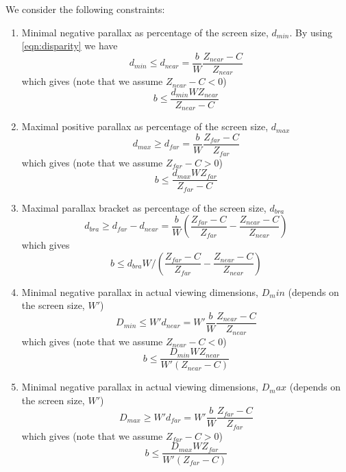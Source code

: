 \documentclass[12pt,a4paper]{article}
\begin{document}
We consider the following constraints:
\begin{enumerate}
 \item Minimal negative parallax as percentage of the screen size, $d_{min}$. By using \eqref{eqn:disparity} we have
 \begin{equation}
  d_{min} \leq d_{near} =  \frac{b}{W} \frac{Z_{near} - C}{Z_{near}}
 \end{equation}
 which gives (note that we assume $Z_{near} - C < 0$)
 \begin{equation}
 b \leq \frac{d_{min} W Z_{near}}{Z_{near} - C}
 \end{equation}
 
 \item Maximal positive parallax as percentage of the screen size, $d_{max}$
 \begin{equation}
  d_{max} \geq  d_{far} = \frac{b}{W} \frac{Z_{far} - C}{Z_{far}}
 \end{equation}
 which gives (note that we assume $Z_{far} - C > 0$)
 \begin{equation}
 b \leq \frac{d_{max} W Z_{far}}{Z_{far} - C}
 \end{equation}
 
 \item Maximal parallax bracket as percentage of the screen size, $d_{bra}$
 \begin{equation}
 d_{bra} \geq d_{far} - d_{near} = \frac{b}{W} \left(\frac{Z_{far} - C}{Z_{far}} - \frac{Z_{near} - C}{Z_{near}} \right)
 \end{equation}
 which gives
 \begin{equation}
 b \leq d_{bra} W \bigg/ \left( \frac{Z_{far} - C}{Z_{far}} - \frac{Z_{near} - C}{Z_{near}} \right)
 \end{equation}
  
 \item Minimal negative parallax in actual viewing dimensions, $D_min$  (depends on the screen size, $W'$)
 \begin{equation}
  D_{min} \leq W' d_{near} =  W' \frac{b}{W} \frac{Z_{near} - C}{Z_{near}}
 \end{equation}
 which gives (note that we assume $Z_{near} - C < 0$)
 \begin{equation}
 b \leq \frac{D_{min} W Z_{near}}{W'(Z_{near} - C)}
 \end{equation}

 \item Minimal negative parallax in actual viewing dimensions, $D_max$  (depends on the screen size, $W'$)
 \begin{equation}
  D_{max} \geq W' d_{far} =  W' \frac{b}{W} \frac{Z_{far} - C}{Z_{far}}
 \end{equation}
 which gives (note that we assume $Z_{far} - C > 0$)
 \begin{equation}
 b \leq \frac{D_{max} W Z_{far}}{W'(Z_{far} - C)}
 \end{equation}
 

\end{enumerate}
\end{document}
